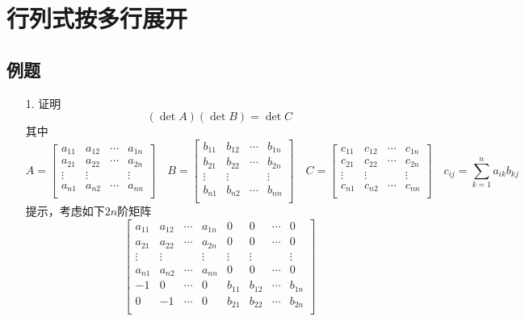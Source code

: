 \section{行列式按多行展开}
\subsection*{例题}
\begin{itemize}
	\item[1.] 证明 $$(\det A)(\det B) = \det C$$
	其中
	\begin{equation*}
	A = \begin{bmatrix}
		a_{11}& a_{12}& \cdots &a_{1n}\\
		a_{21}& a_{22}& \cdots &a_{2n}\\
		\vdots& \vdots&        &\vdots\\
		a_{n1}& a_{n2}& \cdots &a_{nn}\\
	\end{bmatrix}
	\quad
	B = \begin{bmatrix}
		b_{11}& b_{12}& \cdots &b_{1n}\\
		b_{21}& b_{22}& \cdots &b_{2n}\\
		\vdots& \vdots&        &\vdots\\
		b_{n1}& b_{n2}& \cdots &b_{nn}\\
	\end{bmatrix}
	\quad
	C = \begin{bmatrix}
		c_{11}& c_{12}& \cdots &c_{1n}\\
		c_{21}& c_{22}& \cdots &c_{2n}\\
		\vdots& \vdots&        &\vdots\\
		c_{n1}& c_{n2}& \cdots &c_{nn}\\
	\end{bmatrix}
	\quad
	c_{ij} = \sum_{k=1}^n a_{ik}b_{kj}
	\end{equation*}
	提示，考虑如下$2n$阶矩阵
	\begin{equation*}
	\begin{bmatrix}
		a_{11}& a_{12}& \cdots &a_{1n} &0 &0 &\cdots &0\\
		a_{21}& a_{22}& \cdots &a_{2n} &0 &0 &\cdots &0\\
		\vdots& \vdots&        &\vdots &\vdots &\vdots & &\vdots\\
		a_{n1}& a_{n2}& \cdots &a_{nn} &0 &0 & \cdots &0\\
		-1& 0& \cdots& 0&b_{11}& b_{12}& \cdots &b_{1n}\\
		 0&-1& \cdots& 0&b_{21}& b_{22}& \cdots &b_{2n}\\

\end{bmatrix}
\end{equation*}
\end{itemize}
